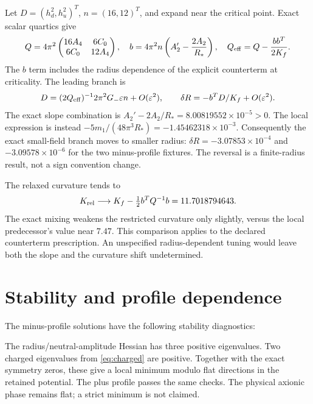 \documentclass[11pt,letterpaper]{article}
\begin{document}
Let $D=(h_d^2,h_u^2)^T$, $n=(16,12)^T$, and expand near the critical point. Exact scalar quartics give
\begin{equation}
 Q=4\pi^2\begin{pmatrix}16A_4&6C_0\\6C_0&12A_4\end{pmatrix},\quad
 b=4\pi^2n\left(A_2'-\frac{2A_2}{R_*}\right),\quad
 Q_{\rm eff}=Q-\frac{bb^T}{2K_f}.
\end{equation}
The $b$ term includes the radius dependence of the explicit counterterm at criticality. The leading branch is
\begin{equation}
 D=(2Q_{\rm eff})^{-1}2\pi^2G_-\varepsilon n+O(\varepsilon^2),\qquad
 \delta R=-b^TD/K_f+O(\varepsilon^2).
\end{equation}
The exact slope combination is $A_2'-2A_2/R_*=8.00819552\times10^{-5}>0$. The local expression is instead $-5m_1/(48\pi^3R_*)=-1.45462318\times10^{-3}$. Consequently the exact small-field branch moves to smaller radius: $\delta R=-3.07853\times10^{-4}$ and $-3.09578\times10^{-6}$ for the two minus-profile fixtures. The reversal is a finite-radius result, not a sign convention change.

The relaxed curvature tends to
\begin{equation}
 K_{\rm rel}\longrightarrow K_f-\tfrac12b^TQ^{-1}b=11.7018794643.
\end{equation}
The exact mixing weakens the restricted curvature only slightly, versus the local predecessor's value near $7.47$. This comparison applies to the declared counterterm prescription. An unspecified radius-dependent tuning would leave both the slope and the curvature shift undetermined.

\section{Stability and profile dependence}

The minus-profile solutions have the following stability diagnostics:
\begin{center}\small\StabilityTable\end{center}
The radius/neutral-amplitude Hessian has three positive eigenvalues. Two charged eigenvalues from \eqref{eq:charged} are positive. Together with the exact symmetry zeros, these give a local minimum modulo flat directions in the retained potential. The plus profile passes the same checks. The physical axionic phase remains flat; a strict minimum is not claimed.
\end{document}
